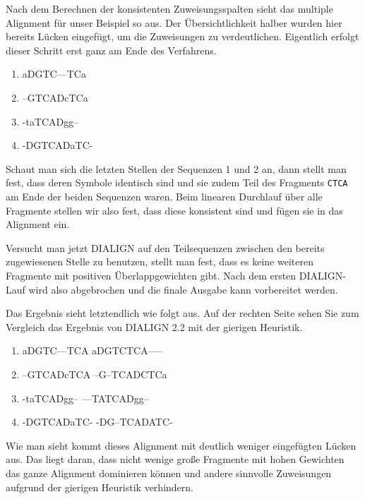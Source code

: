 Nach dem Berechnen der konsistenten Zuweisungsspalten sieht das multiple Alignment für unser Beispiel so aus. Der Übersichtlichkeit halber wurden hier bereits Lücken eingefügt, um die Zuweisungen zu verdeutlichen. Eigentlich erfolgt dieser Schritt erst ganz am Ende des Verfahrens.

\ttfamily
\begin{enumerate}[topsep=0pt,itemsep=-1ex,partopsep=1ex,parsep=1ex]
	\item aDGTC---TCa
	\item --GTCADcTCa
	\item -taTCADgg--
	\item -DGTCADaTC-
\end{enumerate}
\normalfont

Schaut man sich die letzten Stellen der Sequenzen 1 und 2 an, dann stellt man fest, dass deren Symbole identisch sind und sie zudem Teil des Fragments \texttt{CTCA} am Ende der beiden Sequenzen waren. Beim linearen Durchlauf über alle Fragmente stellen wir also fest, dass diese konsistent sind und fügen sie in das Alignment ein.

Versucht man jetzt DIALIGN auf den Teilsequenzen zwischen den bereits zugewiesenen Stelle zu benutzen, stellt man fest, dass es keine weiteren Fragmente mit positiven Überlappgewichten gibt. Nach dem ersten DIALIGN-Lauf wird also abgebrochen und die finale Ausgabe kann vorbereitet werden.

Das Ergebnis sieht letztendlich wie folgt aus. Auf der rechten Seite sehen Sie zum Vergleich das Ergebnis von DIALIGN 2.2 mit der gierigen Heuristik.

\ttfamily
\begin{enumerate}[topsep=0pt,itemsep=-1ex,partopsep=1ex,parsep=1ex]
	\item aDGTC---TCA \hspace{3cm} aDGTCTCA-----
	\item --GTCADcTCA \hspace{3cm} --G--TCADCTCa
	\item -taTCADgg-- \hspace{3cm} ---TATCADgg--
	\item -DGTCADaTC- \hspace{3cm} -DG--TCADATC-
\end{enumerate}
\normalfont

Wie man sieht kommt dieses Alignment mit deutlich weniger eingefügten Lücken aus. Das liegt daran, dass nicht wenige große Fragmente mit hohen Gewichten das ganze Alignment dominieren können und andere sinnvolle Zuweisungen aufgrund der gierigen Heuristik verhindern.

